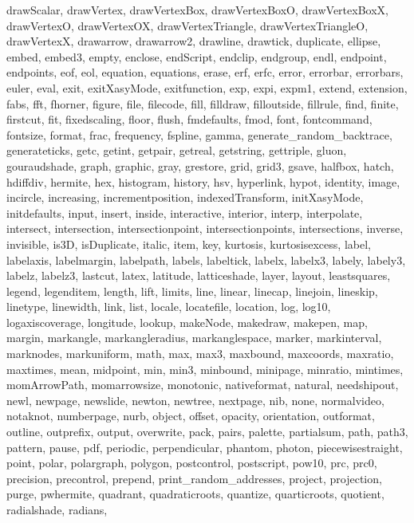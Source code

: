 {{  drawScalar, drawVertex, drawVertexBox, drawVertexBoxO, drawVertexBoxX,
  drawVertexO, drawVertexOX, drawVertexTriangle, drawVertexTriangleO,
  drawVertexX, drawarrow, drawarrow2, drawline, drawtick, duplicate, ellipse,
  embed, embed3, empty, enclose, endScript, endclip, endgroup, endl, endpoint,
  endpoints, eof, eol, equation, equations, erase, erf, erfc, error, errorbar,
  errorbars, euler, eval, exit, exitXasyMode, exitfunction, exp, expi, expm1,
  extend, extension, fabs, fft, fhorner, figure, file, filecode, fill,
  filldraw, filloutside, fillrule, find, finite, firstcut, fit, fixedscaling,
  floor, flush, fmdefaults, fmod, font, fontcommand, fontsize, format, frac,
  frequency, fspline, gamma, generate_random_backtrace, generateticks, getc,
  getint, getpair, getreal, getstring, gettriple, gluon, gouraudshade, graph,
  graphic, gray, grestore, grid, grid3, gsave, halfbox, hatch, hdiffdiv,
  hermite, hex, histogram, history, hsv, hyperlink, hypot, identity, image,
  incircle, increasing, incrementposition, indexedTransform, initXasyMode,
  initdefaults, input, insert, inside, interactive, interior, interp,
  interpolate, intersect, intersection, intersectionpoint, intersectionpoints,
  intersections, inverse, invisible, is3D, isDuplicate, italic, item, key,
  kurtosis, kurtosisexcess, label, labelaxis, labelmargin, labelpath, labels,
  labeltick, labelx, labelx3, labely, labely3, labelz, labelz3, lastcut, latex,
  latitude, latticeshade, layer, layout, leastsquares, legend, legenditem,
  length, lift, limits, line, linear, linecap, linejoin, lineskip, linetype,
  linewidth, link, list, locale, locatefile, location, log, log10,
  logaxiscoverage, longitude, lookup, makeNode, makedraw, makepen, map, margin,
  markangle, markangleradius, markanglespace, marker, markinterval, marknodes,
  markuniform, math, max, max3, maxbound, maxcoords, maxratio, maxtimes, mean,
  midpoint, min, min3, minbound, minipage, minratio, mintimes, momArrowPath,
  momarrowsize, monotonic, nativeformat, natural, needshipout, newl, newpage,
  newslide, newton, newtree, nextpage, nib, none, normalvideo, notaknot,
  numberpage, nurb, object, offset, opacity, orientation, outformat, outline,
  outprefix, output, overwrite, pack, pairs, palette, partialsum, path, path3,
  pattern, pause, pdf, periodic, perpendicular, phantom, photon,
  piecewisestraight, point, polar, polargraph, polygon, postcontrol,
  postscript, pow10, prc, prc0, precision, precontrol, prepend,
  print_random_addresses, project, projection, purge, pwhermite, quadrant,
  quadraticroots, quantize, quarticroots, quotient, radialshade, radians,
}}
